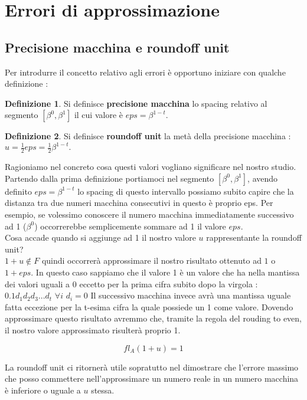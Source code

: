 \documentclass[12pt, a4paper]{book}
\theoremstyle{definition}
\newtheorem{defn}{Definizione}[section]
\begin{document}
\section{Errori di approssimazione}

\subsection{Precisione macchina e roundoff unit}
\begin{flushleft}
Per introdurre il concetto relativo agli errori è opportuno iniziare con qualche definizione :
\begin{defn}
Si definisce \textbf{precisione macchina} lo spacing relativo al segmento $[\beta^0, \beta^1]$ il cui valore è $eps = \beta^{1-t}.$
\end{defn}
\begin{defn}
Si definisce  \textbf{roundoff unit} la metà della precisione macchina : $u = \frac{1}{2}eps =  \frac{1}{2}\beta^{1-t}.$
\end{defn}

Ragioniamo nel concreto cosa questi valori vogliano significare nel nostro studio.\\
Partendo dalla prima definizione portiamoci nel segmento $[\beta^0, \beta^1]$, avendo definito $eps = \beta^{1-t}$ lo spacing di questo intervallo possiamo subito capire che la distanza tra due numeri macchina consecutivi in questo è proprio eps.
Per esempio,  se volessimo conoscere il numero macchina immediatamente successivo ad 1 ($\beta^{0}$) occorrerebbe semplicemente sommare ad 1 il valore $eps$. \\
Cosa accade quando si aggiunge ad 1 il nostro valore $u$ rappresentante la roundoff unit? \\
$ 1 + u \notin F$ quindi occorrerà approssimare il nostro risultato ottenuto ad $1$ o $1+eps$.  In questo caso sappiamo che il valore 1 è un valore che ha nella mantissa dei valori uguali a 0 eccetto per la prima cifra subito dopo la virgola : $0.1d_{1}d_{2}d_{3}...d_{t}$ $\forall i $ $d_{i} = 0$
Il successivo macchina invece avrà una mantissa uguale fatta eccezione per la t-esima cifra la quale possiede un 1 come valore.  Dovendo approssimare questo risultato avremmo che, tramite la regola del rouding to even, il nostro valore approssimato risulterà proprio 1. 

\[ fl_{A}(1+u) = 1  \]

La roundoff unit ci ritornerà utile sopratutto nel dimostrare che l'errore massimo che posso commettere nell'approssimare un numero reale in un numero macchina è inferiore o uguale a $u$ stessa. 
\end{flushleft}
\end{document}
